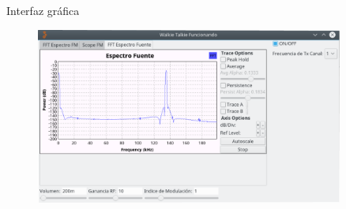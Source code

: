 \begin{frame}{Interfaz gráfica}

\begin{figure}[H]
\centering
\vspace{-3mm}
\includegraphics[width=0.9\textwidth]{parte3/lab14/pdf/Lab14_11.pdf}
\end{figure}

\end{frame}
